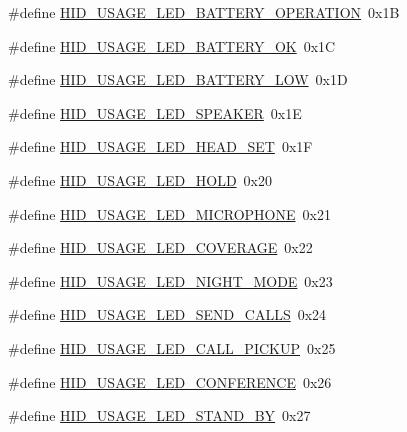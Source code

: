 \begin{DoxyCompactItemize}
\item 
\#define \hyperlink{group__USBD__HID_ga271a64b1cc255d53e0c8a6faaa839a9d}{H\+I\+D\+\_\+\+U\+S\+A\+G\+E\+\_\+\+L\+E\+D\+\_\+\+B\+A\+T\+T\+E\+R\+Y\+\_\+\+O\+P\+E\+R\+A\+T\+I\+ON}~0x1B
\item 
\#define \hyperlink{group__USBD__HID_gaf8763b6fea392885b88bb33268958830}{H\+I\+D\+\_\+\+U\+S\+A\+G\+E\+\_\+\+L\+E\+D\+\_\+\+B\+A\+T\+T\+E\+R\+Y\+\_\+\+OK}~0x1C
\item 
\#define \hyperlink{group__USBD__HID_ga48f4348d9621af4e15ea165120da03be}{H\+I\+D\+\_\+\+U\+S\+A\+G\+E\+\_\+\+L\+E\+D\+\_\+\+B\+A\+T\+T\+E\+R\+Y\+\_\+\+L\+OW}~0x1D
\item 
\#define \hyperlink{group__USBD__HID_ga8624c57f4679741495fa8d327071a019}{H\+I\+D\+\_\+\+U\+S\+A\+G\+E\+\_\+\+L\+E\+D\+\_\+\+S\+P\+E\+A\+K\+ER}~0x1E
\item 
\#define \hyperlink{group__USBD__HID_ga55628e40adac70d0ebf16913ff7fa8e4}{H\+I\+D\+\_\+\+U\+S\+A\+G\+E\+\_\+\+L\+E\+D\+\_\+\+H\+E\+A\+D\+\_\+\+S\+ET}~0x1F
\item 
\#define \hyperlink{group__USBD__HID_gaaf5fe8bc99060dfc70ed7961592591eb}{H\+I\+D\+\_\+\+U\+S\+A\+G\+E\+\_\+\+L\+E\+D\+\_\+\+H\+O\+LD}~0x20
\item 
\#define \hyperlink{group__USBD__HID_ga2875a5dab91a823cd139a9f1222fc411}{H\+I\+D\+\_\+\+U\+S\+A\+G\+E\+\_\+\+L\+E\+D\+\_\+\+M\+I\+C\+R\+O\+P\+H\+O\+NE}~0x21
\item 
\#define \hyperlink{group__USBD__HID_ga5b3c58fa1201bedf7768c49681dae586}{H\+I\+D\+\_\+\+U\+S\+A\+G\+E\+\_\+\+L\+E\+D\+\_\+\+C\+O\+V\+E\+R\+A\+GE}~0x22
\item 
\#define \hyperlink{group__USBD__HID_ga896fc5e9fef8c77f6bc9632d225a3172}{H\+I\+D\+\_\+\+U\+S\+A\+G\+E\+\_\+\+L\+E\+D\+\_\+\+N\+I\+G\+H\+T\+\_\+\+M\+O\+DE}~0x23
\item 
\#define \hyperlink{group__USBD__HID_ga54c05842cb29924ec44436bc1faa36c0}{H\+I\+D\+\_\+\+U\+S\+A\+G\+E\+\_\+\+L\+E\+D\+\_\+\+S\+E\+N\+D\+\_\+\+C\+A\+L\+LS}~0x24
\item 
\#define \hyperlink{group__USBD__HID_gaf351566a10977d6f73f001857f00b8be}{H\+I\+D\+\_\+\+U\+S\+A\+G\+E\+\_\+\+L\+E\+D\+\_\+\+C\+A\+L\+L\+\_\+\+P\+I\+C\+K\+UP}~0x25
\item 
\#define \hyperlink{group__USBD__HID_gaeca2c05d89704467b0a6a33055deafd6}{H\+I\+D\+\_\+\+U\+S\+A\+G\+E\+\_\+\+L\+E\+D\+\_\+\+C\+O\+N\+F\+E\+R\+E\+N\+CE}~0x26
\item 
\#define \hyperlink{group__USBD__HID_gad82fd57bc472dd30b47e712ca83647ce}{H\+I\+D\+\_\+\+U\+S\+A\+G\+E\+\_\+\+L\+E\+D\+\_\+\+S\+T\+A\+N\+D\+\_\+\+BY}~0x27

\end{DoxyCompactItemize}
